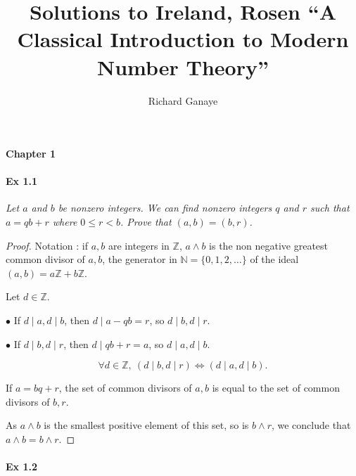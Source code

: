 \documentclass[11pt,a4paper]{article}
\title{Solutions to Ireland, Rosen ``A Classical Introduction to Modern Number Theory''}
\author{Richard Ganaye}
\begin{document}
\maketitle

{\Large \bf Chapter 1}


\paragraph {  Ex 1.1} 

{\it Let $a$ and $b$ be nonzero integers. We can find nonzero integers $q$ and $r$ such that $a = qb + r$ where $0 \leq r < b$. Prove that $(a, b) = (b, r)$.}

\begin{proof}
Notation : if $a,b$ are integers in  $\mathbb{Z}$, $a \wedge b$ is the non negative greatest common divisor of  $a,b$, the generator in  $\mathbb{N} = \{0,1,2,\ldots\} $ of the ideal $(a,b) = a\mathbb{Z}+ b \mathbb{Z}$.


Let $d \in \mathbb{Z}$.

$\bullet$ If $d \mid a, d \mid b$, then  $d \mid a-qb = r$, so $d \mid b, d \mid r$.

$\bullet$ If $d \mid b, d \mid r$, then $d \mid qb+r = a$, so $d \mid a, d \mid b$.

$$ \forall d \in \mathbb{Z}, \  ( d \mid b, d \mid r)  \iff (d \mid a, d \mid b).$$

If $a = bq+r$, the set of common divisors of $a,b$ is equal to the set of common divisors of $b,r$.

As $a \wedge b$ is the smallest positive element of this set, so is  $b \wedge r$, we conclude that $a \wedge b = b \wedge r$.
\end{proof}

\paragraph { Ex 1.2} 
\end{document}
